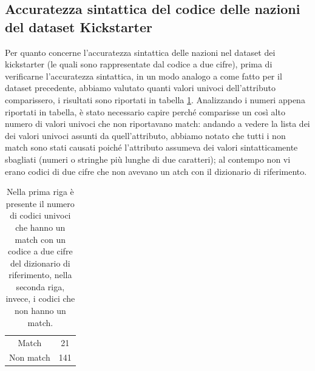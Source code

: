 
\subsection{Accuratezza sintattica del codice delle nazioni del dataset Kickstarter}
Per quanto concerne l'accuratezza sintattica delle nazioni nel dataset dei kickstarter (le quali sono rappresentate dal codice a due cifre), prima di verificarne l'accuratezza sintattica, in un modo analogo a come fatto per il dataset precedente, abbiamo valutato quanti valori univoci dell'attributo comparissero, i risultati sono riportati in tabella \ref{tab:unique_code_country}.
Analizzando i numeri appena riportati in tabella, è stato necessario capire perché comparisse un così alto numero di valori univoci che non riportavano match: andando a vedere la lista dei dei valori univoci assunti da quell'attributo, abbiamo notato che tutti i non match sono stati causati poiché l'attributo assumeva dei valori sintatticamente sbagliati (numeri o stringhe più lunghe di due caratteri); al contempo non vi erano codici di due cifre che non avevano un atch con il dizionario di riferimento.

\begin{table}
	\caption{Nella prima riga è presente il numero di codici univoci che hanno un match con un codice a due cifre del dizionario di riferimento, nella seconda riga, invece, i codici che non hanno un match.}
	
	\label{tab:unique_code_country}
	
	\centering
	\begin{tabular}{c|c}
		Match & 21\\ 
		Non match & 141 \\
	\end{tabular}
\end{table} 

